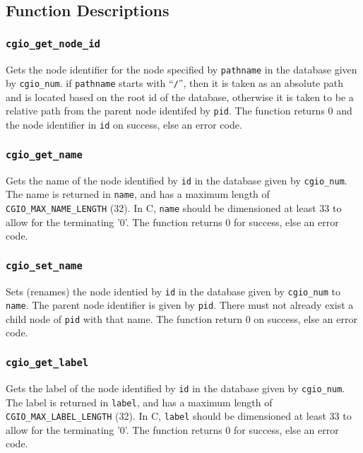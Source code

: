 \subsection{Function Descriptions}

\subsubsection{\texttt{cgio\_get\_node\_id}} \label{get_node_id}
    \noindent
    Gets the node identifier for the node specified by \texttt{pathname}
    in the database given by \texttt{cgio\_num}. if \texttt{pathname} starts
    with ``\texttt{/}'', then it is taken as an absolute path and is located based
    on the root id of the database, otherwise it is taken to be a relative
    path from the parent node identifed by \texttt{pid}. The function returns
    0 and the node identifier in \texttt{id} on success, else an error code.

\subsubsection{\texttt{cgio\_get\_name}} \label{get_name}
    \noindent
    Gets the name of the node identified by \texttt{id} in the database given
    by \texttt{cgio\_num}. The name is returned in \texttt{name}, and has a
    maximum length of \texttt{CGIO\_MAX\_NAME\_LENGTH} (32). In C, \texttt{name}
    should be dimensioned at least 33 to allow for the terminating '0'.
    The function returns 0 for success, else an error code.

\subsubsection{\texttt{cgio\_set\_name}} \label{set_name}
    \noindent
    Sets (renames) the node identied by \texttt{id} in the database given by
    \texttt{cgio\_num} to \texttt{name}. The parent node identifier is given
    by \texttt{pid}. There must not already exist a child node of \texttt{pid}
    with that name. The function return 0 on success, else an error code.

\subsubsection{\texttt{cgio\_get\_label}} \label{get_label}
    \noindent
    Gets the label of the node identified by \texttt{id} in the database given
    by \texttt{cgio\_num}. The label is returned in \texttt{label}, and has a
    maximum length of \texttt{CGIO\_MAX\_LABEL\_LENGTH} (32). In C, \texttt{label}
    should be dimensioned at least 33 to allow for the terminating '0'.
    The function returns 0 for success, else an error code.

